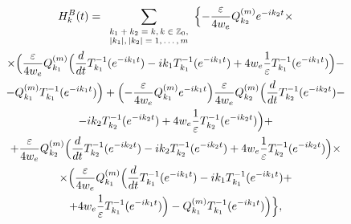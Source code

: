 \begin{multline*}

H^B_k(t)=

\sum_{ 

\scriptsize

\begin{array}{c}

k_1+k_2=k, k\in \mathbb Z_0, \\ |k_1|,|k_2|=1,\dots,m

\end{array}

}\Bigl\{-\frac\varepsilon{4w_e}Q_{k_2}^{(m)}e^{-ik_2t}\times

\\

\times \Bigl(\frac\varepsilon{4w_e}Q_{k_1}^{(m)}\Bigl(\frac{d}{dt} T_{k_1}^{-1}(e^{-ik_1t})-ik_1T_{k_1}^{-1}(e^{-ik_1t})+4w_e\frac1\varepsilon T_{k_1}^{-1}(e^{-ik_1t})\Bigr)-

\\

-Q^{(m)}_{k_1} T_{k_1}^{-1}(e^{-ik_1t}) \Bigr)+\Bigl(-\frac\varepsilon{4w_e}Q_{k_1}^{(m)}e^{-ik_1t}\Bigr)\frac\varepsilon{4w_e}Q_{k_2}^{(m)}\Bigl(\frac{d}{dt} T_{k_2}^{-1}(e^{-ik_2t})-

\\

-ik_2T_{k_2}^{-1}(e^{-ik_2t})+4w_e\frac1\varepsilon T_{k_2}^{-1}(e^{-ik_2t})\Bigr)+

\\

+\frac\varepsilon{4w_e}Q_{k_2}^{(m)}\Bigl(\frac{d}{dt} T_{k_2}^{-1}(e^{-ik_2t})-ik_2T_{k_2}^{-1}(e^{-ik_2t})+4w_e\frac1\varepsilon T_{k_2}^{-1}(e^{-ik_2t})\Bigr)\times

\\

\times \Bigl(\frac\varepsilon{4w_e}Q_{k_1}^{(m)}\Bigl(\frac{d}{dt} T_{k_1}^{-1}(e^{-ik_1t})-ik_1T_{k_1}^{-1}(e^{-ik_1t})+

\\

+4w_e\frac1\varepsilon T_{k_1}^{-1}(e^{-ik_1t})\Bigr)-Q^{(m)}_{k_1} T_{k_1}^{-1}(e^{-ik_1t})\Bigr)\Bigr\}, 

\end{multline*}

